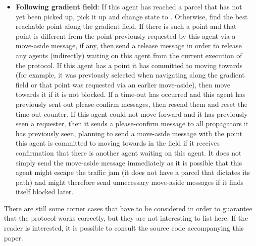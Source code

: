 \begin{itemize}
    \item \textbf{Following gradient field}: If this agent has reached a parcel that has not yet been picked up, pick it up and change state to . Otherwise, find the best reachable point along the gradient field. If there is such a point and that point is different from the point previously requested by this agent via a move-aside message, if any, then send a release message in order to release any agents (indirectly) waiting on this agent from the current execution of the protocol. If this agent has a point it has committed to moving towards (for example, it was previously selected when navigating along the gradient field or that point was requested via an earlier move-aside), then move towards it if it is not blocked. If a time-out has occurred and this agent has previously sent out please-confirm messages, then resend them and reset the time-out counter. If this agent could not move forward and it has previously seen a requester, then it sends a please-confirm message to all propagators it has previously seen, planning to send a move-aside message with the point this agent is committed to moving towards in the  field if it receives confirmation that there is another agent waiting on this agent. It does not simply send the move-aside message immediately as it is possible that this agent might escape the traffic jam (it does not have a parcel that dictates its path) and might therefore send unnecessary move-aside messages if it finds itself blocked later.
\end{itemize}

There are still some corner cases that have to be considered in order to guarantee that the protocol works correctly, but they are not interesting to list here. If the reader is interested, it is possible to consult the source code accompanying this paper.

